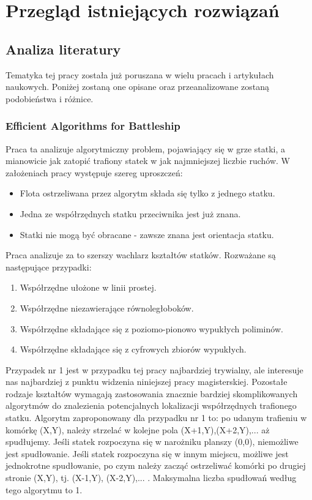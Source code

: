\newpage %
\section{Przegląd istniejących rozwiązań}

\subsection{Analiza literatury}
Tematyka tej pracy została już poruszana w wielu pracach i artykułach naukowych. Poniżej zostaną one opisane oraz przeanalizowane zostaną podobieństwa i różnice.

\subsubsection{Efficient Algorithms for Battleship \cite{crombez2020efficient}}
Praca ta analizuje algorytmiczny problem, pojawiający się w grze statki, a mianowicie jak zatopić trafiony statek w jak najmniejszej liczbie ruchów. W założeniach pracy występuje szereg uproszczeń:
\begin{itemize}
    \item Flota ostrzeliwana przez algorytm składa się tylko z jednego statku.
    \item Jedna ze współrzędnych statku przeciwnika jest już znana.
    \item Statki nie mogą być obracane - zawsze znana jest orientacja statku.
\end{itemize}
Praca analizuje za to szerszy wachlarz kształtów statków. Rozważane są następujące przypadki:
\begin{enumerate}
    \item Współrzędne ułożone w linii prostej.
    \item Współrzędne niezawierające równoległoboków.
    \item Współrzędne składające się z poziomo-pionowo wypukłych poliminów.
    \item Współrzędne składające się z cyfrowych zbiorów wypukłych.
\end{enumerate}

Przypadek nr 1 jest w przypadku tej pracy najbardziej trywialny, ale interesuje nas najbardziej z punktu widzenia niniejszej pracy magisterskiej. Pozostałe rodzaje kształtów wymagają zastosowania znacznie bardziej skomplikowanych algorytmów do znalezienia potencjalnych lokalizacji współrzędnych trafionego statku.
Algorytm zaproponowany dla przypadku nr 1 to: po udanym trafieniu w komórkę (X,Y), należy strzelać w kolejne pola (X+1,Y),(X+2,Y),... aż spudłujemy. Jeśli statek rozpoczyna się w narożniku planszy (0,0), niemożliwe jest spudłowanie. Jeśli statek rozpoczyna się w innym miejscu, możliwe jest jednokrotne spudłowanie, po czym należy zacząć ostrzeliwać komórki po drugiej stronie (X,Y), tj. (X-1,Y), (X-2,Y),... . Maksymalna liczba spudłowań według tego algorytmu to 1.

